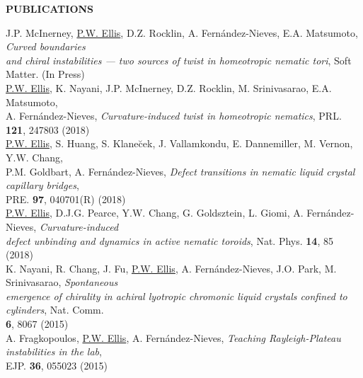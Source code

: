 \documentclass[10pt]{article}
\newenvironment{changemargin}[2]{%
  \list{}{\rightmargin#2\leftmargin#1
    \parsep=0pt\topsep=1pt\partopsep=0pt}
\item[]} {\endlist}
\newenvironment{indentmore}{\begin{changemargin}{10pt}{0cm}}{\end{changemargin}}
\begin{document}
\vspace{10pt}
\textbf{\large PUBLICATIONS}
\begin{indentmore}
J.P. McInerney, \underline{P.W. Ellis}, D.Z. Rocklin, A. Fern\'{a}ndez-Nieves, E.A. Matsumoto, \emph{Curved boundaries \\ \hspace*{15pt} and chiral instabilities --- two sources of twist in homeotropic nematic tori}, Soft Matter. (In Press) \\

\underline{P.W. Ellis}, K. Nayani, J.P. McInerney, D.Z. Rocklin, M. Srinivasarao, E.A. Matsumoto, \\ \hspace*{15pt} A. Fern\'{a}ndez-Nieves, \emph{Curvature-induced twist in homeotropic nematics}, PRL. {\bf 121}, 247803 (2018) \\

\underline{P.W. Ellis}, S. Huang, S. Klane\u{c}ek, J. Vallamkondu, E. Dannemiller, M. Vernon, Y.W. Chang, \\ \hspace*{15pt} P.M. Goldbart, A. Fern\'{a}ndez-Nieves, \emph{Defect transitions in nematic liquid crystal capillary bridges},\\ \hspace*{15pt} PRE. {\bf 97}, 040701(R) (2018)\\

\underline{P.W. Ellis}, D.J.G. Pearce, Y.W. Chang, G. Goldsztein, L. Giomi, A. Fern\'{a}ndez-Nieves, \emph{Curvature-induced \\ \hspace*{15pt} defect unbinding and dynamics in active nematic toroids}, Nat. Phys. {\bf 14}, 85 (2018) \\

K. Nayani, R. Chang, J. Fu, \underline{P.W. Ellis}, A. Fern\'{a}ndez-Nieves, J.O. Park, M. Srinivasarao, \emph{Spontaneous \\ \hspace*{15pt} emergence of chirality in achiral lyotropic chromonic liquid crystals confined to cylinders}, Nat. Comm. \\ \hspace*{15pt} {\bf 6}, 8067 (2015)  \\

A. Fragkopoulos, \underline{P.W. Ellis}, A. Fern\'{a}ndez-Nieves, \emph{Teaching Rayleigh-Plateau instabilities in the lab}, \\ \hspace*{15pt}EJP. {\bf 36}, 055023 (2015) \\


\end{indentmore}
\end{document}
